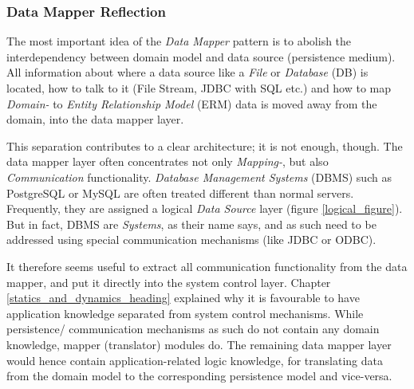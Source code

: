 %
%
%
%
%
%
%

\subsubsection{Data Mapper Reflection}
\label{data_mapper_reflection_heading}

The most important idea of the \emph{Data Mapper} pattern is to abolish the
interdependency between domain model and data source (persistence medium). All
information about where a data source like a \emph{File} or \emph{Database}
(DB) is located, how to talk to it (File Stream, JDBC with SQL etc.) and how to
map \emph{Domain-} to \emph{Entity Relationship Model} (ERM) data is moved away
from the domain, into the data mapper layer.

This separation contributes to a clear architecture; it is not enough, though.
The data mapper layer often concentrates not only \emph{Mapping-}, but also
\emph{Communication} functionality. \emph{Database Management Systems} (DBMS)
such as PostgreSQL \cite{hartwig, postgresql, postgresql2002} or MySQL
\cite{mysql} are often treated different than normal servers. Frequently, they
are assigned a logical \emph{Data Source} layer (figure \ref{logical_figure}).
But in fact, DBMS are \emph{Systems}, as their name says, and as such need to
be addressed using special communication mechanisms (like JDBC or ODBC).

It therefore seems useful to extract all communication functionality from the
data mapper, and put it directly into the system control layer. Chapter
\ref{statics_and_dynamics_heading} explained why it is favourable to have
application knowledge separated from system control mechanisms. While
persistence/ communication mechanisms as such do not contain any domain
knowledge, mapper (translator) modules do. The remaining data mapper layer
would hence contain application-related logic knowledge, for translating data
from the domain model to the corresponding persistence model and vice-versa.

